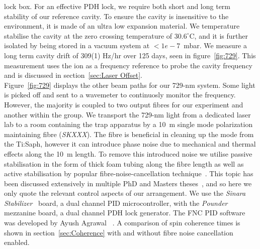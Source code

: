     lock box. For an effective PDH lock, we require both short and long term
    stability of our reference cavity. To ensure the cavity is insensitive to
    the environment, it is made of an ultra low expansion material. We
    temperature stabilise the cavity at the zero crossing temperature of
    $30.6^\circ$C, and it is further isolated by being stored in a vacuum system
    at $<1e-7$~mbar. We measure a long term cavity drift of 309(1) Hz/hr over
    125 days, seen in figure~\ref{fig:729}. This measurement uses the ion as a
    frequency reference to probe the cavity frequency and is discussed in
    section~\ref{sec:Laser Offset}.\\
    Figure~\ref{fig:729} displays the other beam paths for our 729-nm system.
    Some light is picked off and sent to a wavemeter to continuosly monitor the
    frequency. However, the majority is coupled to two output fibres for our
    experiment and another within the group. We transport the 729-nm light from
    a dedicated laser lab to a room containing the trap apparatus by a 10~m
    single mode polarization maintaining fibre (\emph{SKXXX}).  The fibre is
    beneficial in cleaning up the mode from the Ti:Saph, however it can
    introduce phase noise due to mechanical and thermal effects along the 10~m
    length. To remove this introduced noise we utilise passive stabilisation in
    the form of thick foam tubing along the fibre length as well as active
    stabilisation by popular fibre-noise-cancellation technique~\cite{XXX}. This
    topic has been discussed extensively in multiple PhD and Masters
    theses~\cite{XXX}, and so here we only quote the relevant control aspects of
    our arrangement. We use the \emph{Sinara Stabilizer}~\cite{XXX} board, a
    dual channel PID microcontroller, with the \emph{Pounder}~\cite{XXX}
    mezzanine board, a dual channel PDH lock generator. The FNC PID software was
    developed by Ayush Agrawal ~\cite{XXX}. A comparison of spin coherence times
    is shown in section~\ref{sec:Coherence} with and without fibre noise
    cancellation enabled. \\



